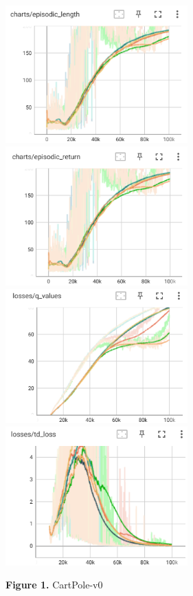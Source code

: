 \documentclass[english, a4paper,12pt]{article}
\begin{document}
\begin{figure}[h!]
    \begin{minipage}{0.5\textwidth}

        \includegraphics[width=7cm]{episodic_length_cartpole.png} 
        \includegraphics[width=7cm]{episodic_return_cartpole.png}
        \includegraphics[width=7cm]{q_values_cartpole.png}
        \includegraphics[width=7cm]{td_loss_cartpole.png}
        \caption*{\textbf{Figure 1.} CartPole-v0}

\end{minipage}
\end{figure}
\end{document}
